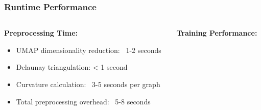 \documentclass[10pt, aspectratio = 169]{beamer}
\begin{document}
\begin{frame}
    \frametitle{Runtime Performance}
    \begin{columns}[t]
        \begin{column}{0.33\textwidth}
            \textbf{Preprocessing Time:}
            \begin{itemize}
                \small
                \item UMAP dimensionality reduction: ~1-2 seconds
                \item Delaunay triangulation: < 1 second
                \item Curvature calculation: ~3-5 seconds per graph
                \item Total preprocessing overhead: ~5-8 seconds
            \end{itemize}
        \end{column}
        \begin{column}{0.33\textwidth}
        \textbf{Training Performance:}
            \begin{itemize}
        \small


\end{itemize}
\end{column}
\end{columns}
\end{frame}
\end{document}
